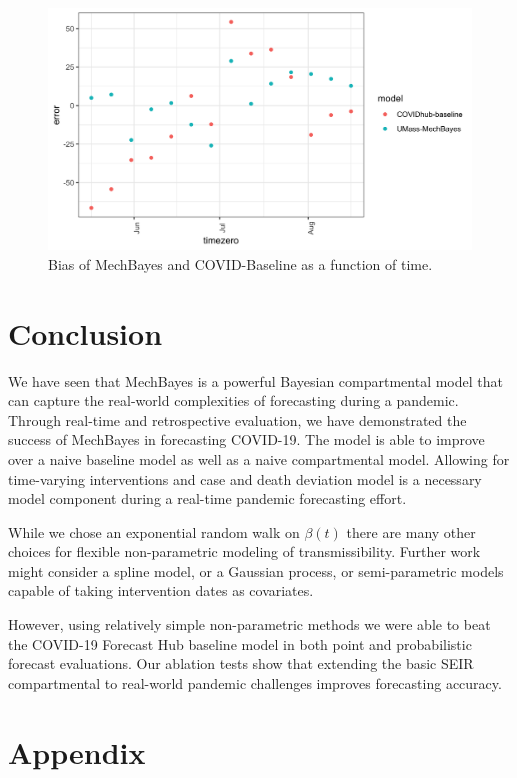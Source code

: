 \documentclass{umassthesis}          %
\begin{document}
\begin{figure}
\centering
\includegraphics[scale=.15]{bias_by_timezero.png}
\caption{Bias of MechBayes and COVID-Baseline as a function of time.  }
\label{fig:results_discussion}
\end{figure}



\section{Conclusion}

We have seen that MechBayes is a powerful Bayesian compartmental model that can capture the real-world complexities of forecasting during a pandemic. Through real-time and retrospective evaluation, we have demonstrated the success of MechBayes in forecasting COVID-19. The model is able to improve over a naive baseline model as well as a naive compartmental model. Allowing for time-varying interventions and case and death deviation model is a necessary model component during a real-time pandemic forecasting effort. 

While we chose an exponential random walk on $\beta(t)$ there are many other choices for flexible non-parametric modeling of transmissibility. Further work might consider a spline model, or a Gaussian process, or semi-parametric models capable of taking intervention dates as covariates. 

However, using relatively simple non-parametric methods we were able to beat the COVID-19 Forecast Hub baseline model in both point and probabilistic forecast evaluations. Our ablation tests show that extending the basic SEIR compartmental to real-world pandemic challenges improves forecasting accuracy. 


\newpage

\section{Appendix}
\end{document}
